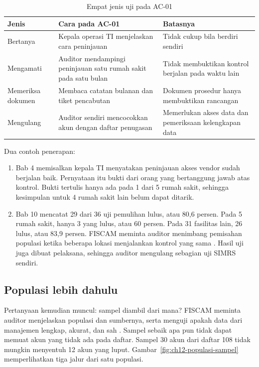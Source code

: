 \begin{table}[!htb]
  \centering\small
  \caption{Empat jenis uji pada AC-01}\label{tab:ch12-jenis-uji}
  \begin{tabularx}{\textwidth}{|>{\raggedright\arraybackslash}p{}|>{\raggedright\arraybackslash}X|>{\raggedright\arraybackslash}X|}
    \hline
    \textbf{Jenis} & \textbf{Cara pada AC-01} & \textbf{Batasnya} \\ \hline
    Bertanya & Kepala operasi TI menjelaskan cara peninjauan & Tidak cukup bila berdiri sendiri \\
    \hline
    Mengamati & Auditor mendampingi peninjauan satu rumah sakit pada satu bulan & Tidak membuktikan
    kontrol berjalan pada waktu lain \\ \hline
    Memeriksa dokumen & Membaca catatan bulanan dan tiket pencabutan & Dokumen prosedur hanya
    membuktikan rancangan \\ \hline
    Mengulang & Auditor sendiri mencocokkan akun dengan daftar penugasan & Memerlukan akses data dan
    pemeriksaan kelengkapan data \\ \hline
  \end{tabularx}
\end{table}

Dua contoh penerapan:
\begin{enumerate}
  \item Bab 4 memisalkan kepala TI menyatakan peninjauan akses vendor sudah berjalan baik.
  Pernyataan itu bukti dari orang yang bertanggung jawab atas kontrol. Bukti tertulis hanya ada pada
  1 dari 5 rumah sakit, sehingga kesimpulan untuk 4 rumah sakit lain belum dapat ditarik.
  \item Bab 10 mencatat 29 dari 36 uji pemulihan lulus, atau 80,6 persen. Pada 5 rumah sakit, hanya
  3 yang lulus, atau 60 persen. Pada 31 fasilitas lain, 26 lulus, atau 83,9 persen. FISCAM meminta
  auditor menimbang pemisahan populasi ketika beberapa lokasi menjalankan kontrol yang sama
  \cite{c12-fiscam2026}. Hasil uji juga dibuat pelaksana, sehingga auditor mengulang sebagian uji
  SIMRS sendiri.
\end{enumerate}

\subsection*{Populasi lebih dahulu}

Pertanyaan kemudian muncul: sampel diambil dari mana? FISCAM meminta auditor menjelaskan populasi
dan sumbernya, serta menguji apakah data dari manajemen lengkap, akurat, dan sah
\cite{c12-fiscam2026}. Sampel sebaik apa pun tidak dapat memuat akun yang tidak ada pada daftar.
Sampel 30 akun dari daftar 108 tidak mungkin menyentuh 12 akun yang luput.
Gambar~\ref{fig:ch12-populasi-sampel} memperlihatkan tiga jalur dari satu populasi.

